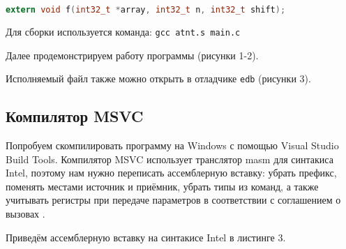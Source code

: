 \begin{lstlisting}[language={c}, caption={Объявление функции в С}, numbers=none]
            extern void f(int32_t *array, int32_t n, int32_t shift);
\end{lstlisting}

Для сборки используется команда: \texttt{gcc atnt.s main.c}

Далее продемонстрируем работу программы (рисунки 1-2).

\FloatBarrier

Исполняемый файл также можно открыть в отладчике \texttt{edb} (рисунки 3).

\FloatBarrier


\subsection{Компилятор MSVC}

Попробуем скомпилировать программу на Windows с помощью Visual Studio Build Tools. Компилятор MSVC использует транслятор masm для синтакиса Intel, поэтому нам нужно переписать ассемблерную вставку: убрать префикс, поменять местами источник и приёмник, убрать типы из команд, а также учитывать регистры при передаче параметров в соответствии с соглашением о вызовах \cite{agreement}.

Приведём ассемблерную вставку на синтакисе Intel в листинге 3.

